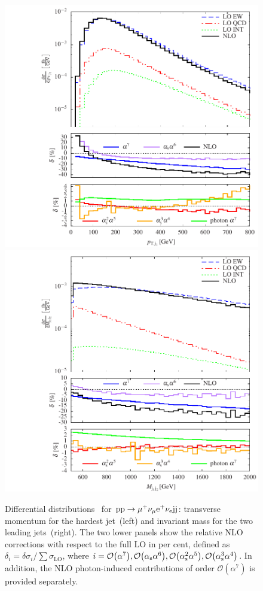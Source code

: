 \begin{figure}
\includegraphics[width=.47\textwidth]{WG1_plots/histogram_transverse_momentum_j1}
\hfill
\includegraphics[width=.47\textwidth]{WG1_plots/histogram_invariant_mass_mjj12}
\caption{Differential distributions~\cite{Biedermann:2017bss} for ${\rm p}{\rm p}\to\mu^+\nu_\mu{\rm e}^+\nu_{\rm e}{\rm j}{\rm j}$:
transverse momentum for the hardest jet~(left) and invariant mass for the two leading jets~(right).
The two lower panels show the relative NLO corrections with respect to the full LO in per cent,
defined as $\delta_i = \delta \sigma_{i} / \sum \sigma_{\text{LO}}$, 
where $i=\mathcal{O}{\left(\alpha^{7}\right)},\mathcal{O}{\left(\alpha_{\rm s}\alpha^{6}\right)},\mathcal{O}{\left(\alpha_{\rm s}^2\alpha^{5}\right)},\mathcal{O}{\left(\alpha_{\rm s}^3\alpha^{4}\right)}$.
In addition, the NLO photon-induced contributions of order $\mathcal{O}{\left(\alpha^{7}\right)}$ is provided separately.}
\label{fig:VBSALL}
\end{figure}

